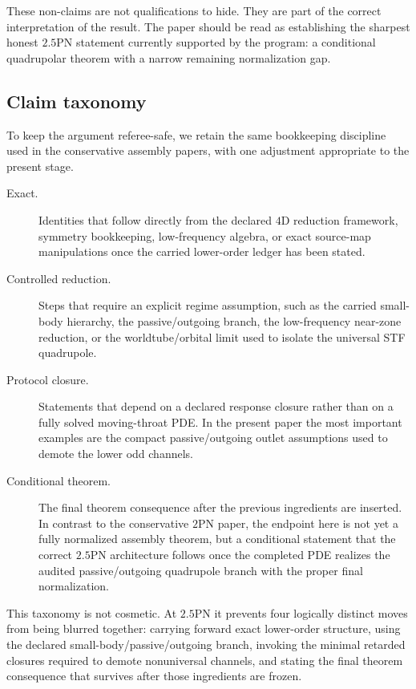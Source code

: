 \documentclass[11pt]{article}
\begin{document}
These non-claims are not qualifications to hide.  They are part of the correct
interpretation of the result.  The paper should be read as establishing the
sharpest honest $2.5$PN statement currently supported by the program: a
conditional quadrupolar theorem with a narrow remaining normalization gap.

\subsection{Claim taxonomy}
\label{sec:intro-taxonomy}

To keep the argument referee-safe, we retain the same bookkeeping discipline used
in the conservative assembly papers, with one adjustment appropriate to the
present stage.
\begin{description}
  \item[Exact.] Identities that follow directly from the declared $4$D reduction
  framework, symmetry bookkeeping, low-frequency algebra, or exact source-map
  manipulations once the carried lower-order ledger has been stated.

  \item[Controlled reduction.] Steps that require an explicit regime assumption,
  such as the carried small-body hierarchy, the passive/outgoing branch, the
  low-frequency near-zone reduction, or the worldtube/orbital limit used to
  isolate the universal STF quadrupole.

  \item[Protocol closure.] Statements that depend on a declared response closure
  rather than on a fully solved moving-throat PDE.  In the present paper the
  most important examples are the compact passive/outgoing outlet assumptions
  used to demote the lower odd channels.

  \item[Conditional theorem.] The final theorem consequence after the previous
  ingredients are inserted.  In contrast to the conservative $2$PN paper, the
  endpoint here is not yet a fully normalized assembly theorem, but a conditional
  statement that the correct $2.5$PN architecture follows once the completed PDE
  realizes the audited passive/outgoing quadrupole branch with the proper final
  normalization.
\end{description}

This taxonomy is not cosmetic.  At $2.5$PN it prevents four logically distinct
moves from being blurred together: carrying forward exact lower-order structure,
using the declared small-body/passive/outgoing branch, invoking the minimal
retarded closures required to demote nonuniversal channels, and stating the
final theorem consequence that survives after those ingredients are frozen.
\end{document}

